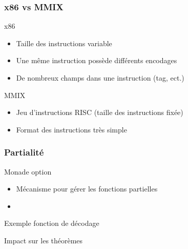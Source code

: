 \documentclass{beamer}
\newcommand{\codefrom}[3]
           {}
\begin{document}
\begin{frame}
\frametitle{x86 vs MMIX}

\begin{block}{x86}
  \begin{itemize}
    \item Taille des instructions variable
    \item Une même instruction possède différents encodages
    \item De nombreux champs dans une instruction (tag, ect.)
    \end{itemize}  
\end{block}

\begin{block}{MMIX}
  \begin{itemize}
  \item Jeu d'instructions RISC (taille des instructions fixée)
  \item Format des instructions très simple
  \end{itemize}  
\end{block}

\vfill

\end{frame}
\begin{frame}
\frametitle{Partialité} 

\begin{block}{Monade option}
  \begin{itemize}
  \item Mécanisme pour gérer les fonctions partielles
  \item \fontsize{8}{10} \codefrom{rapport}{definitions}{option}
  \end{itemize}  
\end{block}
\begin{block}{Exemple fonction de décodage}
  \fontsize{8}{10} \codefrom{src}{encode}{decode}
\end{block}

\begin{block}{Impact sur les théorèmes}
  \fontsize{8}{10} \codefrom{src}{decodeProof}{decode_encode}
\end{block}
  




\end{frame}
\end{document}
